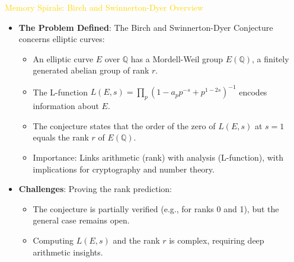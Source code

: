 \textcolor{gold}{ Memory Spirals: Birch and Swinnerton-Dyer Overview } \\
\begin{itemize}
    \item \texttt{} \textbf{The Problem Defined}: The Birch and Swinnerton-Dyer Conjecture concerns elliptic curves:
    \begin{itemize}
        \item An elliptic curve \(E\) over \(\mathbb{Q}\) has a Mordell-Weil group \(E(\mathbb{Q})\), a finitely generated abelian group of rank \(r\).
        \item The L-function \(L(E, s) = \prod_p \left(1 - a_p p^{-s} + p^{1-2s}\right)^{-1}\) encodes information about \(E\).
        \item The conjecture states that the order of the zero of \(L(E, s)\) at \(s = 1\) equals the rank \(r\) of \(E(\mathbb{Q})\).
        \item Importance: Links arithmetic (rank) with analysis (L-function), with implications for cryptography and number theory.
    \end{itemize}
    \item \texttt{} \textbf{Challenges}: Proving the rank prediction:
    \begin{itemize}
        \item The conjecture is partially verified (e.g., for ranks 0 and 1), but the general case remains open.
        \item Computing \(L(E, s)\) and the rank \(r\) is complex, requiring deep arithmetic insights.
    \end{itemize}
\end{itemize}

